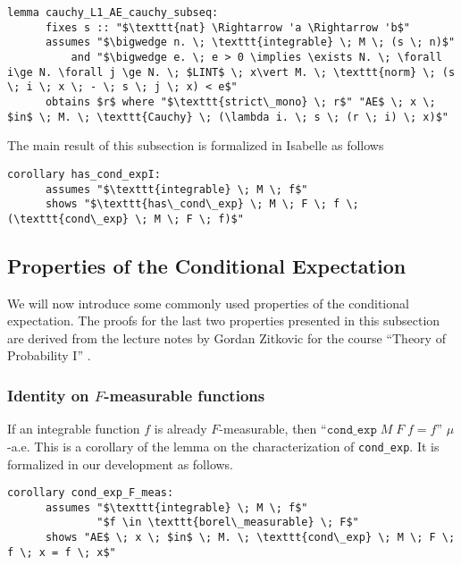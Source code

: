 \begin{isalemma}
{\small
	\begin{lstlisting}[style=isabelle]
	lemma cauchy_L1_AE_cauchy_subseq:
	  fixes s :: "$\texttt{nat} \Rightarrow 'a \Rightarrow 'b$"
	  assumes "$\bigwedge n. \; \texttt{integrable} \; M \; (s \; n)$"
		  and "$\bigwedge e. \; e > 0 \implies \exists N. \; \forall i\ge N. \forall j \ge N. \; $LINT$ \; x\vert M. \; \texttt{norm} \; (s \; i \; x \; - \; s \; j \; x) < e$"
	  obtains $r$ where "$\texttt{strict\_mono} \; r$" "AE$ \; x \; $in$ \; M. \; \texttt{Cauchy} \; (\lambda i. \; s \; (r \; i) \; x)$"
	\end{lstlisting}
}
\end{isalemma}


The main result of this subsection is formalized in Isabelle as follows

\begin{isacorollary}
{\small
	\begin{lstlisting}[style=isabelle]
	corollary has_cond_expI:
	  assumes "$\texttt{integrable} \; M \; f$"
	  shows "$\texttt{has\_cond\_exp} \; M \; F \; f \; (\texttt{cond\_exp} \; M \; F \; f)$"
	\end{lstlisting}
}
\end{isacorollary}

\subsection{Properties of the Conditional Expectation}

We will now introduce some commonly used properties of the conditional expectation. The proofs for the last two properties presented in this subsection are derived from the lecture notes by Gordan Zitkovic for the course ``Theory of Probability I'' \cite{Zitkovic_2015}.

\subsubsection{Identity on $F$-measurable functions}

If an integrable function $f$ is already $F$-measurable, then ``$\texttt{cond\_exp} \; M \; F \; f = f$'' $\mu$-a.e. This is a corollary of the lemma on the characterization of \texttt{cond\_exp}. It is formalized in our development as follows.
\begin{isacorollary}
{\small
	\begin{lstlisting}[style=isabelle]
	corollary cond_exp_F_meas:
	  assumes "$\texttt{integrable} \; M \; f$"
			  "$f \in \texttt{borel\_measurable} \; F$"
	  shows "AE$ \; x \; $in$ \; M. \; \texttt{cond\_exp} \; M \; F \; f \; x = f \; x$"
	\end{lstlisting}
}
\end{isacorollary}

